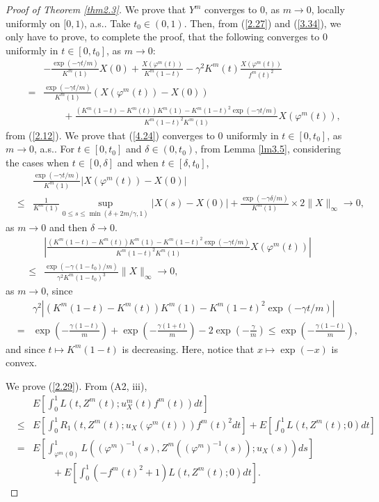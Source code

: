 \documentclass[12pt]{article}
\begin{document}
\begin{proof}[Proof of Theorem \ref{thm2.3}]
We   prove that
$Y^m$ converges  to $0$, as $m\to 0$, locally uniformly on $[0,1)$, a.s..
Take $t_0\in (0,1)$. %
Then, from (\ref{2.27}) and (\ref{3.34}), we only have to prove, to complete the proof,  that the following converges to $0$ uniformly in $t\in [0, t_0]$, as $m\to 0$:
\begin{eqnarray}\label{4.24}
&&-\frac{\exp(-\gamma t/m)}{K^m(1)}X(0)+
\frac{X(\varphi^m(t))}{K^m(1-t)}-\gamma^2K^m(t)\frac{X(\varphi^m (t))}{f^m(t)^2}\\
&=  &\frac{\exp(-\gamma t/m)}{K^m(1)}(X(\varphi^m(t))-X(0))\nonumber\\
&&\qquad +
\frac{(K^m(1-t)-K^m(t))K^m(1)-K^m(1-t)^2\exp(-\gamma t/m)}{K^m(1-t)^2K^m(1)}X(\varphi^m(t)),\nonumber
\end{eqnarray}
from (\ref{2.12}). 
We prove that (\ref{4.24}) converges to $0$ uniformly in $t\in [0, t_0]$, as $m\to 0$, a.s..
For $t\in [0, t_0]$ and $\delta\in (0,t_0)$, from Lemma \ref{lm3.5},
considering the cases when $t\in [0,\delta]$ and when  $t\in [\delta,t_0]$,
\begin{eqnarray}
&&\frac{\exp(-\gamma t/m)}{K^m(1)}|X(\varphi^m(t))-X(0)|\\
&\le&  \frac{1}{K^m(1)}\sup_{0\le s\le\min(\delta+2m/\gamma,1)} |X(s)-X(0)|
+\frac{\exp(-\gamma \delta/m)}{K^m(1)}\times 2\|X\|_\infty
\to 0,\nonumber
\end{eqnarray}
as $m\to 0$ and then $\delta\to 0$.
\begin{eqnarray}
&&\left|\frac{(K^m(1-t)-K^m(t))K^m(1)-K^m(1-t)^2\exp(-\gamma t/m)}{K^m(1-t)^2K^m(1)}X(\varphi^m(t))\right|\qquad\quad\\
&\le& 
\frac{\exp(-\gamma (1-t_0)/m)}{\gamma^2K^m(1-t_0)^3}\|X\|_\infty \to 0,\nonumber
\end{eqnarray}
as $m\to 0$,  since
\begin{eqnarray*}
&&\gamma^2|(K^m(1-t)-K^m(t))K^m(1)-K^m(1-t)^2\exp(-\gamma t/m)|\\
&=&\exp\left(-\frac{\gamma (1-t)}{m}\right)+\exp\left(-\frac{\gamma (1+t)}{m}\right)
-2\exp\left(-\frac{\gamma }{m}\right)\le \exp\left(-\frac{\gamma (1-t)}{m}\right),
\end{eqnarray*}
and since $t\mapsto K^m(1-t)$ is decreasing. 
Here, notice that $x\mapsto \exp (-x)$ is convex.

We prove (\ref{2.29}).
From (A2, iii),
\begin{eqnarray}
&&E\left[\int_0^1L(t, Z^m(t);u_X^m(t)f^m(t))dt\right]\label{4.28}\\
& \le& 
E\left[\int_0^1R_1(t, Z^m(t); u_X(\varphi^m(t)))f^m(t)^2dt\right]
+E\left[\int_0^1L(t, Z^m(t); 0)dt\right]\nonumber\\
&=&
E\left[\int_{\varphi^m(0)}^1L((\varphi^m)^{-1}(s), Z^m((\varphi^m)^{-1}(s));u_X(s))ds\right]\nonumber\\
&&\qquad +E\left[\int_0^1(-f^m(t)^2+1)L(t, Z^m(t); 0)dt\right].\nonumber
\end{eqnarray}


\end{proof}
\end{document}
